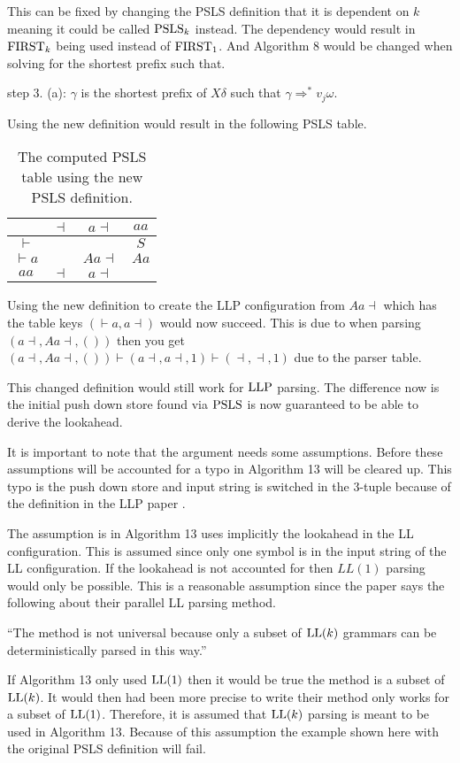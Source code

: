 This can be fixed by changing the PSLS definition that it is dependent on $k$ meaning it could be called $\text{PSLS}_k$ instead. The dependency would result in $\text{FIRST}_k$ being used instead of $\text{FIRST}_1$. And Algorithm 8 would be changed when solving for the shortest prefix such that.
\begin{center}
    step 3. (a): $\gamma$ is the shortest prefix of $X\delta$ such that $\gamma \Rightarrow^* v_j \omega$. 
\end{center}
Using the new definition would result in the following PSLS table.
\begin{table}[H]
    \centering
    \begin{tabular}{c|c|c|c}
        & $\dashv$ & $a\dashv$ & $aa$ \\ \hline
        $\vdash$ & & & $S$ \\\hline
        $\vdash a$ & & $Aa\dashv$ & $Aa$ \\\hline
        $aa$ & $\dashv$ & $a\dashv$ & 
    \end{tabular}
    \caption{The computed PSLS table using the new PSLS definition.}
\end{table}
\noindent Using the new definition to create the LLP configuration from $Aa\dashv$ which has the table keys $(\vdash a,a \dashv)$ would now succeed. This is due to when parsing $(a \dashv, Aa\dashv, ())$ then you get $(a \dashv, Aa\dashv, ()) \vdash (a \dashv, a\dashv, 1) \vdash ( \dashv, \dashv, 1)$ due to the parser table.

This changed definition would still work for $\text{LLP}$ parsing. The difference now is the initial push down store found via $\text{PSLS}$ is now guaranteed to be able to derive the lookahead.

It is important to note that the argument needs some assumptions. Before these assumptions will be accounted for a typo in Algorithm 13 will be cleared up. This typo is the push down store and input string is switched in the 3-tuple because of the definition in the LLP paper \cite[5]{Vagner2007}.

The assumption is in Algorithm 13 uses implicitly the lookahead in the LL configuration. This is assumed since only one symbol is in the input string of the LL configuration. If the lookahead is not accounted for then $LL(1)$ parsing would only be possible. This is a reasonable assumption since the paper says the following about their parallel LL parsing method.
\begin{center}
    ``The method is not universal because only a subset of $\text{LL}(k)$ grammars can be deterministically parsed in this way.'' \cite[2]{Vagner2007}
\end{center}
If Algorithm 13 only used $\text{LL}(1)$ then it would be true the method is a subset of $\text{LL}(k)$. It would then had been more precise to write their method only works for a subset of $\text{LL}(1)$. Therefore, it is assumed that $\text{LL}(k)$ parsing is meant to be used in Algorithm 13. Because of this assumption the example shown here with the original PSLS definition will fail.


